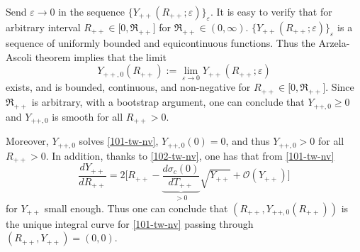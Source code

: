 \documentclass[12pt]{article}
\theoremstyle{definition}
\theoremstyle{remark}
\numberwithin{equation}{section}
\begin{document}
Send $ \varepsilon \rightarrow 0 $ in the sequence $ \lbrace Y_{++}(R_{++};\varepsilon) \rbrace_\varepsilon $. It is easy to verify that for arbitrary interval $ R_{++} \in \lbrack 0, \mathfrak R_{++} \rbrack $ for $ \mathfrak R_{++} \in (0,\infty) $. $ \lbrace Y_{++}(R_{++};\varepsilon) \rbrace_\varepsilon $ is a sequence of uniformly bounded and equicontinuous functions. Thus the  Arzela-Ascoli theorem implies that the limit
\begin{equation}
    \label{105-tw-nv}
    Y_{{++},0}(R_{++}) := \lim_{\varepsilon \rightarrow 0} Y_{++}(R_{++};\varepsilon)
\end{equation}
exists, and is bounded, continuous, and non-negative for $ R_{++} \in \lbrack 0, \mathfrak R_{++} \rbrack $. Since $ \mathfrak R_{++} $ is arbitrary, with a bootstrap argument, one can conclude that $ Y_{++,0} \geq 0 $ and $ Y_{++,0} $ is smooth for all $ R_{++}> 0 $.

Moreover, $ Y_{++,0} $ solves \eqref{101-tw-nv}, $ Y_{++,0}(0) = 0 $, and thus $ Y_{++,0} > 0 $ for all $ R_{++} > 0 $. In addition, thanks to \eqref{102-tw-nv}, 
one has that from \eqref{101-tw-nv}
\begin{equation}
    \label{106-tw-nv}
    \frac{dY_{++}}{dR_{++}} = 2\lbrack R_{++} - \underbrace{\frac{d\sigma_c(0)}{dT_{++}}}_{>0} \sqrt{Y_{++}} + \mathcal O(Y_{++}) \rbrack
\end{equation}
for $ Y_{++} $ small enough. Thus one can conclude that $ (R_{++}, Y_{++,0}(R_{++})) $ is the unique integral curve for \eqref{101-tw-nv} passing through $ (R_{++}, Y_{++}) = (0,0) $.

\smallskip 
\end{document}
